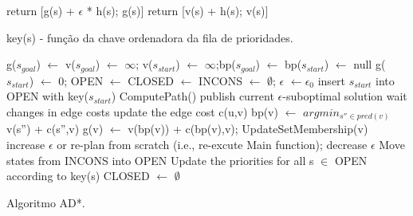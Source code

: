 \begin{algorithm}[H]
\SetAlgoLined
{
	return [g(s) + $\epsilon$ * h(s); g(s)]\;
}
{
	return [v(s) + h(s); v(s)]\;
}
\caption{key(s) - função da chave ordenadora da fila de prioridades.}
\end{algorithm}

\newpage
\begin{algorithm}[H]
\SetAlgoLined
g($s_{goal}$) $\leftarrow$ v($s_{goal}$) $\leftarrow$ $\infty$; v($s_{start}$) $\leftarrow$ $\infty$;bp($s_{goal}$) $\leftarrow$ bp($s_{start}$) $\leftarrow$ null\;
g($s_{start}$) $\leftarrow$ 0; OPEN $\leftarrow$ CLOSED $\leftarrow$ INCONS $\leftarrow$ $\emptyset$; $\epsilon$ $\leftarrow \epsilon_{0}$\;
insert $s_{start}$ into OPEN with key($s_{start}$)\;
{
	ComputePath()\;
	publish current $\epsilon$-suboptimal solution\;
	{
		wait changes in edge costs\;
	}
	{
		update the edge cost c(u,v)\;
		{
			bp(v) $\leftarrow$ $argmin_{s'' \in pred(v)}$ v(s'') + c(s'',v)\;
			g(v) $\leftarrow$ v(bp(v)) + c(bp(v),v); UpdateSetMembership(v)\;
		}
	}
	{
		increase $\epsilon$ or re-plan from scratch (i.e., re-excute Main function);
	}
	{
		{
			decrease $\epsilon$\;
		}
	}
		Move states from INCONS into OPEN\;
		Update the priorities for all s $\in$ OPEN according to key(s)\;
		CLOSED $\leftarrow$ $\emptyset$\;
}
		
\caption{Algoritmo AD*.}
\end{algorithm}


